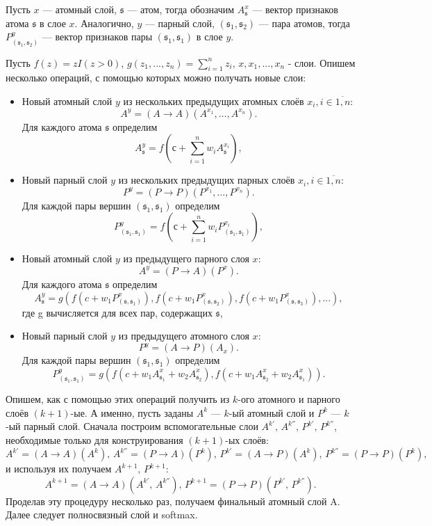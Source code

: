 \documentclass[12pt,twoside]{article}
\begin{document}
	Пусть $x$ --- атомный слой, $\mathfrak{s}$ --- атом, тогда обозначим $A^x_\mathfrak{s}$ --- вектор признаков атома $\mathfrak{s}$ в слое $x$. Аналогично, $y$ --- парный слой, $(\mathfrak{s}_1, \mathfrak{s}_2)$ --- пара атомов, тогда $P^y_{(\mathfrak{s}_1, \mathfrak{s}_2)}$ --- вектор признаков пары $(\mathfrak{s}_1, \mathfrak{s}_1)$ в слое $y$.
	
	Пусть $f(z) = z I(z > 0)$, $g(z_1,..., z_n) = \sum_{i=1}^n{z_i}$, $x, x_1,...,x_n$ - слои. Опишем несколько операций, с помощью которых можно получать новые слои:
	\begin{itemize}
	\item Новый атомный слой $y$ из нескольких предыдущих атомных слоёв $x_i, i \in \overline{1, n}$: $$A^y = (A\to A)(A^{x_1},\dots,A^{x_n}).$$ Для каждого атома $\mathfrak{s}$ определим $$A^y_\mathfrak{s} = f(с+\sum_{i=1}^n {w_i A^{x_i}_\mathfrak{s}}),$$ 
	\item Новый парный слой $y$ из нескольких предыдущих парных слоёв $x_i, i \in \overline{1, n}$: $$P^y = (P\to P)(P^{x_1},\dots,P^{x_n}).$$ Для каждой пары вершин $(\mathfrak{s}_1, \mathfrak{s}_1)$ определим $$P^y_{(\mathfrak{s}_1, \mathfrak{s}_1)} = f(с+\sum_{i=1}^n {w_i P^{x_i}_{(\mathfrak{s}_1, \mathfrak{s}_1)}}),$$
	\item Новый атомный слой $y$ из предыдущего парного слоя $x$: $$A^y = (P\to A)(P^x).$$ Для каждого атома $\mathfrak{s}$ определим $$A^y_\mathfrak{s} = g(f(c + w_1 P^x_{(\mathfrak{s}, \mathfrak{s}_1)}), f(c + w_1 P^x_{(\mathfrak{s}, \mathfrak{s}_2)}), f(c + w_1 P^x_{(\mathfrak{s}, \mathfrak{s}_3)}),...),$$ где g вычисляется для всех пар, содержащих $\mathfrak{s}$,
	\item Новый парный слой $y$ из предыдущего атомного слоя $x$: $$P^y = (A\to P)(A_x).$$ Для каждой пары вершин $(\mathfrak{s}_1, \mathfrak{s}_1)$ определим $$P^y_{(\mathfrak{s}_1, \mathfrak{s}_1)} = g\left(f(c + w_1 A^x_{\mathfrak{s}_1} + w_2 A^x_{\mathfrak{s}_2}), f(c + w_1 A^x_{\mathfrak{s}_2} + w_2 A^x_{\mathfrak{s}_1})\right).$$
	\end{itemize}
	
	Опишем, как с помощью этих операций получить из $k$-ого атомного и парного слоёв $(k+1)$-ые. А именно, пусть заданы $A^k$ --- $k$-ый атомный слой и $P^k$ --- $k$-ый парный слой. Сначала построим вспомогательные слои $A^{k'},\, A^{k''},\, P^{k'},\, P^{k''}$, необходимые только для конструирования $(k+1)$-ых слоёв: $$A^{k'} = (A\to A)(A^k),\, A^{k''}=(P\to A)(P^k),\, P^{k'}=(A \to P)(A^k),\, P^{k''}=(P\to P)(P^k),$$ и используя их получаем $A^{k+1},\, P^{k+1}$: $$A^{k+1} = (A\to A)(A^{k'},\, A^{k''}),\, P^{k+1} = (P\to P)(P^{k'},\, P^{k''}).$$
	Проделав эту процедуру несколько раз, получаем финальный атомный слой A. Далее следует полносвязный слой и softmax.
\end{document}
